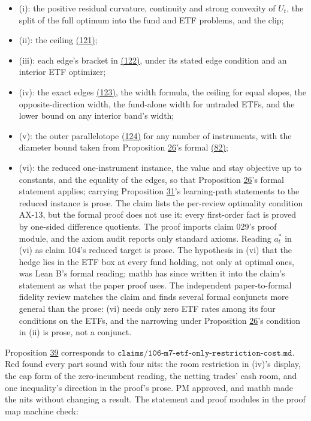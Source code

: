\documentclass[11pt]{article}
\begin{document}
\begin{itemize}
  \item (i): the positive residual curvature, continuity and strong
  convexity of \(U_t\), the split of the full optimum into the fund and
  ETF problems, and the clip;
  \item (ii): the ceiling \hyperref[eq:121]{(121)};
  \item (iii): each edge's bracket in \hyperref[eq:122]{(122)}, under its stated edge condition
  and an interior ETF optimizer;
  \item (iv): the exact edges \hyperref[eq:123]{(123)}, the width formula, the ceiling for equal
  slopes, the opposite-direction width, the fund-alone width for
  untraded ETFs, and the lower bound on any interior band's width;
  \item (v): the outer parallelotope \hyperref[eq:124]{(124)} for any number of instruments,
  with the diameter bound taken from Proposition \hyperref[res:Proposition-26]{26}'s formal \hyperref[eq:82]{(82)};
  \item (vi): the reduced one-instrument instance, the value and stay
  objective up to constants, and the equality of the edges, so that
  Proposition \hyperref[res:Proposition-26]{26}'s formal statement applies; carrying Proposition \hyperref[res:Proposition-31]{31}'s
  learning-path statements to the reduced instance is prose.
The claim lists the per-review optimality condition AX-13, but the
formal proof does not use it: every first-order fact is proved by
one-sided difference quotients. The proof imports claim 029's proof
module, and the axiom audit reports only standard axioms. Reading
\(a^*_t\) in (vi) as claim 104's reduced target is prose. The hypothesis
in (vi) that the hedge lies in the ETF box at every fund holding, not
only at optimal ones, was Lean B's formal reading; mathb has since
written it into the claim's statement as what the paper proof uses.
The independent paper-to-formal fidelity review matches the claim and
finds several formal conjuncts more general than the prose: (vi) needs
only zero ETF rates among its four conditions on the ETFs, and the
narrowing under Proposition \hyperref[res:Proposition-26]{26}'s condition in (ii) is prose, not a
conjunct.
\end{itemize}

Proposition \hyperref[res:Proposition-39]{39} corresponds to
\(\texttt{claims/106-m7-etf-only-restriction-cost.md}\). Red found every
part sound with four nits: the room restriction in (iv)'s display, the
cap form of the zero-incumbent reading, the netting trades' cash room,
and one inequality's direction in the proof's prose. PM approved, and
mathb made the nits without changing a result. The statement and proof
modules in the proof map machine check:
\end{document}
